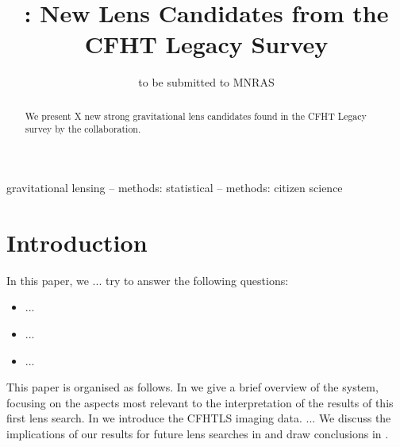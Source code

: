 \documentclass[useAMS,usenatbib,a4paper]{mn2e}
\title[\sw]
{\SW: New Lens Candidates from the CFHT Legacy Survey}
\author[More et al.]{%
  
}
\begin{document}
             
\date{to be submitted to MNRAS}
\pagerange{\pageref{firstpage}--\pageref{lastpage}}

\maketitle           

\label{firstpage}


\begin{abstract} 

We present X new strong gravitational lens candidates found in the CFHT Legacy
survey by the \sw collaboration. 

\end{abstract}


\begin{keywords}
  gravitational lensing   --
  methods: statistical    --
  methods: citizen science
\end{keywords}

\setcounter{footnote}{1}


\section{Introduction}
\label{sec:intro}


In this paper, we ... try to answer the following questions:

\begin{itemize}

\item ...

\item ...

\item ...

\end{itemize}

This paper is organised as follows. In  we give a brief overview
of the \sw system, focusing on the aspects most relevant to the interpretation
of the results of this first lens search. In  we introduce the
CFHTLS imaging data. ... We discuss the implications of our results for future
lens searches in  and draw conclusions in
.
\end{document}
